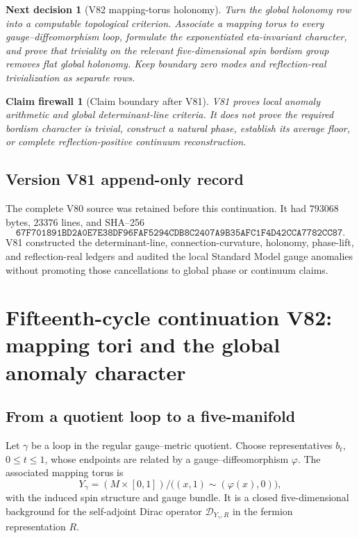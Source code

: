 \documentclass[11pt]{article}
\newtheorem{firewall}[theorem]{Claim firewall}
\newtheorem{decision}[theorem]{Next decision}
\theoremstyle{remark}
\begin{document}
\begin{decision}[V82 mapping-torus holonomy]
\label{dec:v15v81-next}
Turn the global holonomy row into a computable topological
criterion.  Associate a mapping torus to every gauge--diffeomorphism
loop, formulate the exponentiated eta-invariant character, and
prove that triviality on the relevant five-dimensional spin
bordism group removes flat global holonomy.  Keep boundary
zero modes and reflection-real trivialization as separate rows.
\end{decision}

\begin{firewall}[Claim boundary after V81]
\label{fire:v15v81}
V81 proves local anomaly arithmetic and global determinant-line
criteria.  It does not prove the required bordism character is
trivial, construct a natural phase, establish its average floor,
or complete reflection-positive continuum reconstruction.
\end{firewall}

\section*{Version V81 append-only record}
The complete V80 source was retained before this continuation.  It
had \(793068\) bytes, \(23376\) lines, and SHA--256
\[
 \texttt{67F701891BD2A0E7E38DF96FAF5294CDB8C2407A9B35AFC1F4D42CCA7782CC87}.
\]
V81 constructed the determinant-line, connection-curvature,
holonomy, phase-lift, and reflection-real ledgers and audited the
local Standard Model gauge anomalies without promoting those
cancellations to global phase or continuum claims.

\chapter{Fifteenth-cycle continuation V82: mapping tori and the global anomaly character}
\label{sec:v15v82}

\section{From a quotient loop to a five-manifold}

Let \(\gamma\) be a loop in the regular gauge--metric quotient.
Choose representatives \(b_t\), \(0\leq t\leq1\), whose endpoints
are related by a gauge--diffeomorphism \(\varphi\).  The associated
mapping torus is
\[
 Y_\gamma
 =
 (M\times[0,1])/
 \bigl((x,1)\sim(\varphi(x),0)\bigr),                 \tag{82.1}
\]
with the induced spin structure and gauge bundle.  It is a closed
five-dimensional background for the self-adjoint Dirac operator
\({\mathscr D}_{Y_\gamma,R}\) in the fermion representation \(R\).
\end{document}
